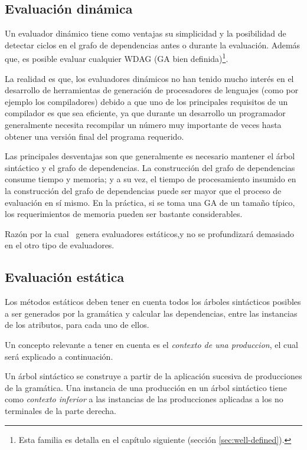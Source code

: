 \subsection{Evaluación dinámica}

Un evaluador dinámico tiene como ventajas su simplicidad y la posibilidad de detectar ciclos en el grafo de dependencias antes o durante la evaluación. Además que, es posible evaluar cualquier WDAG (GA bien definida)\footnote{Esta familia es detalla en el capítulo siguiente (sección \ref{sec:well-defined}).}.

La realidad es que, los evaluadores dinámicos no han tenido mucho interés en el desarrollo de herramientas de generación de procesadores de lenguajes (como por ejemplo los compiladores) debido a que uno de los principales requisitos de un compilador es que sea eficiente, ya que durante un desarrollo un programador generalmente necesita recompilar un número muy importante de veces hasta obtener una versión final del programa requerido.

Las principales desventajas son que generalmente es necesario mantener el árbol sintáctico y el grafo de dependencias. La construcción del grafo de dependencias consume tiempo y memoria; y a su vez, el tiempo de procesamiento insumido en la construcción del grafo de dependencias puede ser mayor que el proceso de evaluación en sí mismo. En la práctica, si se toma una GA de un tamaño típico, los requerimientos de memoria pueden ser bastante considerables.  

Razón por la cual \maggen\ genera evaluadores estáticos,y no se profundizará demasiado en el otro tipo de evaluadores.

\subsection{Evaluación estática}
\label{subsec:eval-est}
Los métodos estáticos deben tener en cuenta todos los árboles sintácticos posibles a ser generados por la gramática y calcular las dependencias, entre las instancias de los atributos, para cada uno de ellos. 

Un concepto relevante a tener en cuenta es el \textit{contexto de una produccion}, el cual será explicado a continuación.

Un árbol sintáctico se construye a partir de la aplicación sucesiva de producciones de la gramática. Una instancia de una producción en un árbol sintáctico tiene como \emph{contexto inferior} a las instancias de las producciones aplicadas a los no terminales de la parte derecha.

